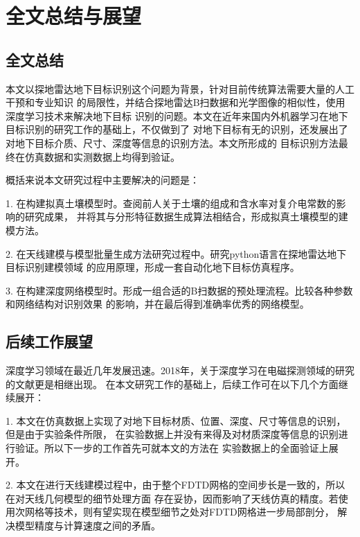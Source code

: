 \chapter{全文总结与展望}

\section{全文总结}
本文以探地雷达地下目标识别这个问题为背景，针对目前传统算法需要大量的人工干预和专业知识
的局限性，并结合探地雷达B扫数据和光学图像的相似性，使用深度学习技术来解决地下目标
识别的问题。本文在近年来国内外机器学习在地下目标识别的研究工作的基础上，不仅做到了
对地下目标有无的识别，还发展出了对地下目标介质、尺寸、深度等信息的识别方法。本文所形成的
目标识别方法最终在仿真数据和实测数据上均得到验证。

概括来说本文研究过程中主要解决的问题是：

1. 在构建拟真土壤模型时。查阅前人关于土壤的组成和含水率对复介电常数的影响的研究成果，
并将其与分形特征数据生成算法相结合，形成拟真土壤模型的建模方法。

2. 在天线建模与模型批量生成方法研究过程中。研究python语言在探地雷达地下目标识别建模领域
的应用原理，形成一套自动化地下目标仿真程序。

3. 在构建深度网络模型时。形成一组合适的B扫数据的预处理流程。比较各种参数和网络结构对识别效果
的影响，并在最后得到准确率优秀的网络模型。

\section{后续工作展望}
深度学习领域在最近几年发展迅速。2018年，关于深度学习在电磁探测领域的研究的文献更是相继出现。
在本文研究工作的基础上，后续工作可在以下几个方面继续展开：

1. 本文在仿真数据上实现了对地下目标材质、位置、深度、尺寸等信息的识别，但是由于实验条件所限，
在实验数据上并没有来得及对材质深度等信息的识别进行验证。所以下一步的工作首先可就本文的方法在
实验数据上的全面验证上展开。

2. 本文在进行天线建模过程中，由于整个FDTD网格的空间步长是一致的，所以在对天线几何模型的细节处理方面
存在妥协，因而影响了天线仿真的精度。若使用次网格等技术，则有望实现在模型细节之处对FDTD网格进一步局部剖分，
解决模型精度与计算速度之间的矛盾。
